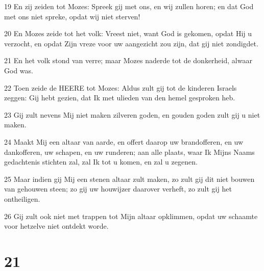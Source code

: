 \par 19 En zij zeiden tot Mozes: Spreek gij met ons, en wij zullen horen; en dat God met ons niet spreke, opdat wij niet sterven!
\par 20 En Mozes zeide tot het volk: Vreest niet, want God is gekomen, opdat Hij u verzocht, en opdat Zijn vreze voor uw aangezicht zou zijn, dat gij niet zondigdet.
\par 21 En het volk stond van verre; maar Mozes naderde tot de donkerheid, alwaar God was.
\par 22 Toen zeide de HEERE tot Mozes: Aldus zult gij tot de kinderen Israels zeggen: Gij hebt gezien, dat Ik met ulieden van den hemel gesproken heb.
\par 23 Gij zult nevens Mij niet maken zilveren goden, en gouden goden zult gij u niet maken.
\par 24 Maakt Mij een altaar van aarde, en offert daarop uw brandofferen, en uw dankofferen, uw schapen, en uw runderen; aan alle plaats, waar Ik Mijns Naams gedachtenis stichten zal, zal Ik tot u komen, en zal u zegenen.
\par 25 Maar indien gij Mij een stenen altaar zult maken, zo zult gij dit niet bouwen van gehouwen steen; zo gij uw houwijzer daarover verheft, zo zult gij het ontheiligen.
\par 26 Gij zult ook niet met trappen tot Mijn altaar opklimmen, opdat uw schaamte voor hetzelve niet ontdekt worde.

\chapter{21}

